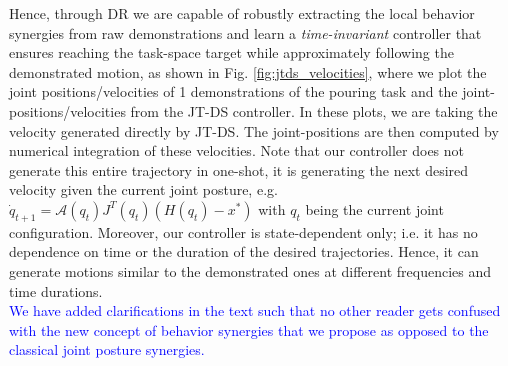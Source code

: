 \documentclass{article}
\begin{document}
\begin{enumerate}
Hence, through DR we are capable of robustly extracting the local behavior synergies from raw demonstrations and learn a \textit{time-invariant} controller that ensures reaching the task-space target while approximately following the demonstrated motion, as shown in Fig. \ref{fig:jtds_velocities}, where we plot the joint positions/velocities of 1 demonstrations of the pouring task and the joint-positions/velocities from the JT-DS controller. In these plots, we are taking the velocity generated directly by JT-DS. The joint-positions are then computed by numerical integration of these velocities. Note that our controller does not generate this entire trajectory in one-shot, it is generating the next desired velocity given the current joint posture, e.g. $\dot{q}_{t+1} = \mathcal{A}(q_{t})J^T(q_{t})(H(q_{t})-x^*)$ with $q_t$ being the current joint configuration. Moreover, our controller is state-dependent only; i.e. it has no dependence on time or the duration of the desired trajectories. Hence, it can generate motions similar to the demonstrated ones at different frequencies and time durations. \\

\noindent \textcolor{blue}{We have added clarifications in the text such that no other reader gets confused with the new concept of behavior synergies that we propose as opposed to the classical joint posture synergies.}




\end{enumerate}
\end{document}
